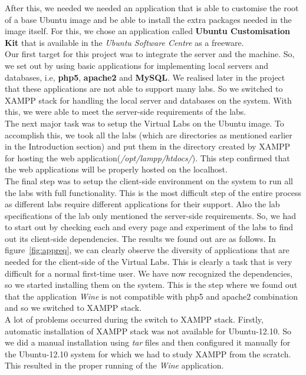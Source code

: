 \documentclass[conference]{IEEEtran}
\begin{document}
  After this, we needed we needed an application that is able to customise the root of a base Ubuntu image and be able to install the extra packages needed in the image itself. For this, we chose an application called \textbf{Ubuntu Customisation Kit} that is available in the \textit{Ubuntu Software Centre} as a freeware.\\ 
  Our first target for this project was to integrate the server and the machine. So, we set out by using basic applications for implementing local servers and databases, i.e, \textbf{php5}, \textbf{apache2} and \textbf{MySQL}. We realised later in the project that these applications are not able to support many labs. So we switched to XAMPP stack for handling the local server and databases on the system. With this, we were able to meet the server-side requirements of the labs.\\
  The next major task was to setup the Virtual Labs on the Ubuntu image. To accomplish this, we took all the labs (which are directories as mentioned earlier in the Introduction section) and put them in the directory created by XAMPP for hosting the web application(\textit{/opt/lampp/htdocs/}). This step confirmed that the web applications will be properly hosted on the localhost.\\
  The final step was to setup the client-side environment on the system to run all the labs with full functionality. This is the most difficult step of the entire process as different labs require different applications for their support. Also the lab specifications of the lab only mentioned the server-side requirements. So, we had to start out by checking each and every page and experiment of the labs to find out its client-side dependencies. The results we found out are as follows.
    In figure~\ref{fig:appreq}, we can clearly observe the diversity of applications that are needed for the client-side of the Virtual Labs. This is clearly a task that is very difficult for a normal first-time user. We have now recognized the dependencies, so we started installing them on the system. This is the step where we found out that the application \textit{Wine} is not compatible with php5 and apache2 combination and so we switched to XAMPP stack.\\
    A lot of problems occurred during the switch to XAMPP stack. Firstly, automatic installation of XAMPP stack was not available for Ubuntu-12.10. So we did a manual installation using \textit{tar} files and then configured it manually for the Ubuntu-12.10 system for which we had to study XAMPP from the scratch. This resulted in the proper running of the \textit{Wine} application.\\
\end{document}
